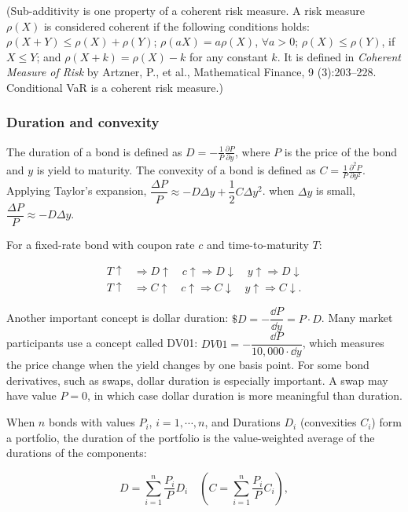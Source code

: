 \begin{solution}
(Sub-additivity is one property of a coherent risk measure. A risk measure $\rho(X)$ is
considered coherent if the following conditions holds: $\rho(X+Y)\leq\rho(X)+\rho(Y)$;
$\rho(aX)=a\rho(X)$, $\forall a>0$; $\rho(X)\leq\rho(Y)$, if $X\leq Y$; and
$\rho(X+k)=\rho(X)-k$ for any constant $k$. It is defined in \emph{Coherent Measure of
Risk} by Artzner, P., et al., Mathematical Finance, 9 (3):203--228. Conditional VaR is
a coherent risk measure.)

\end{solution}

\subsubsection*{Duration and convexity}

The duration of a bond is defined as $D=-\frac{1}{P}\frac{\partial P}{\partial y}$, where
$P$ is the price of the bond and $y$ is yield to maturity. The convexity of a bond is
defined as $C=\frac{1}{P}\frac{\partial^2P}{\partial y^2}$. Applying Taylor's expansion,
$\dfrac{\Delta P}{P}\approx-D\Delta y+\dfrac{1}{2}C\Delta y^2$. when $\Delta y$ is
small, $\dfrac{\Delta P}{P}\approx-D\Delta y$.

For a fixed-rate bond with coupon rate $c$ and time-to-maturity $T$:


\[
\begin{aligned}
T\uparrow&\Rightarrow D\uparrow\quad c\uparrow\Rightarrow D\downarrow\quad y\uparrow\Rightarrow D\downarrow\\
T\uparrow&\Rightarrow C\uparrow\quad c\uparrow\Rightarrow C\downarrow\quad y\uparrow\Rightarrow C\downarrow.
\end{aligned}
\]

Another important concept is dollar duration: $\$D=-\dfrac{\dd P}{\dd y}=P\cdot D$. Many
market participants use a concept called DV01: $DV01=-\dfrac{\dd P}{10,000\cdot\dd y}$,
which measures the price change when the yield changes by one basis point. For some bond
derivatives, such as swaps, dollar duration is especially important. A swap may have value
$P=0$, in which case dollar duration is more meaningful than duration.

When $n$ bonds with values $P_i$, $i=1,\cdots,n$, and Durations $D_i$ (convexities $C_i$)
form a portfolio, the duration of the portfolio is the value-weighted average of the
durations of the components:

\[
D=\sum_{i=1}^{n}\frac{P_i}{P}D_i\quad
\left(C=\sum_{i=1}^{n}\frac{P_i}{P}C_i\right),
\]

